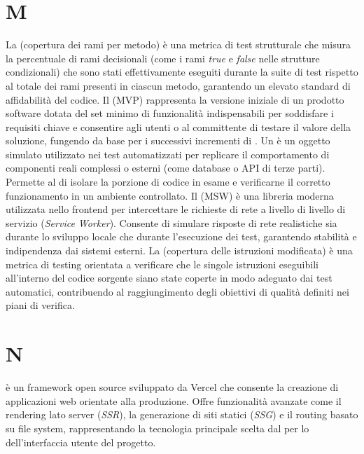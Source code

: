 \section{M}
La  (copertura dei rami per metodo) è una metrica di test strutturale che misura la percentuale di rami decisionali (come i rami \emph{true} e \emph{false} nelle strutture condizionali) che sono stati effettivamente eseguiti durante la suite di test rispetto al totale dei rami presenti in ciascun metodo, garantendo un elevato standard di affidabilità del codice.
Il  (MVP) rappresenta la versione iniziale di un prodotto software dotata del set minimo di funzionalità indispensabili per soddisfare i requisiti chiave e consentire agli utenti o al committente di testare il valore della soluzione, fungendo da base per i successivi incrementi di .
Un  è un oggetto simulato utilizzato nei test automatizzati per replicare il comportamento di componenti reali complessi o esterni (come database o API di terze parti). Permette al  di isolare la porzione di codice in esame e verificarne il corretto funzionamento in un ambiente controllato.
Il  (MSW) è una libreria moderna utilizzata nello  frontend per intercettare le richieste di rete a livello di livello di servizio (\emph{Service Worker}). Consente di simulare risposte di rete realistiche sia durante lo sviluppo locale che durante l'esecuzione dei test, garantendo stabilità e indipendenza dai sistemi esterni.
La  (copertura delle istruzioni modificata) è una metrica di testing orientata a verificare che le singole istruzioni eseguibili all'interno del codice sorgente siano state coperte in modo adeguato dai test automatici, contribuendo al raggiungimento degli obiettivi di qualità definiti nei piani di verifica.
\section{N}
 è un framework  open source sviluppato da Vercel che consente la creazione di applicazioni web orientate alla produzione. Offre funzionalità avanzate come il rendering lato server (\emph{SSR}), la generazione di siti statici (\emph{SSG}) e il routing basato su file system, rappresentando la tecnologia principale scelta dal  per lo  dell'interfaccia utente del progetto.
